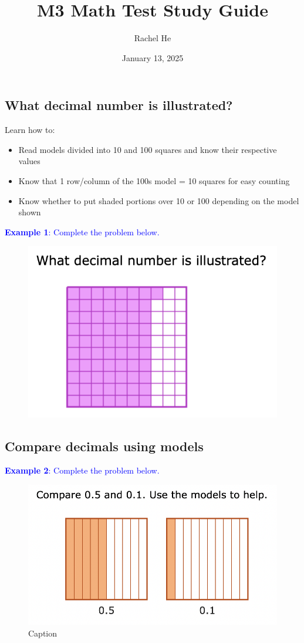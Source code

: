 \documentclass[a4paper, 12pt]{article}
\title{M3 Math Test Study Guide}
\author{Rachel He}
\date{January 13, 2025}
\begin{document}
\maketitle

\subsection*{What decimal number is illustrated?}
Learn how to:

\begin{itemize}
    \item Read models divided into 10 and 100 squares and know their respective values
    \item Know that 1 row/column of the 100s model = 10 squares for easy counting
    \item Know whether to put shaded portions over 10 or 100 depending on the model shown
\end{itemize}

\textcolor{blue}{\textbf{Example 1}: Complete the problem below.}

\begin{figure}[H]
    \centering
    \includegraphics[width=0.5\linewidth]{dec.png}
    \label{fig:1}
\end{figure}

\subsection*{Compare decimals using models}

\textcolor{blue}{\textbf{Example 2}: Complete the problem below.}

\begin{figure}[H]
    \centering
    \includegraphics[width=0.5\linewidth]{comp.png}
    \caption{Caption}
    \label{fig:enter-label}
\end{figure}
\end{document}
